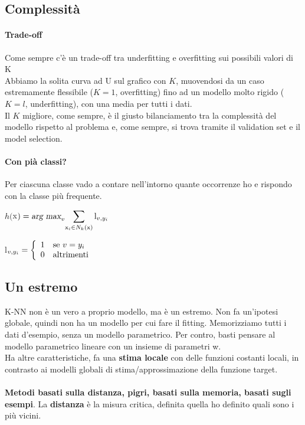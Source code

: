 \documentclass[10pt]{book}
\begin{document}
\subsection{Complessità}
\paragraph{Trade-off} Come sempre c'è un trade-off tra underfitting e overfitting sui possibili valori di K\\
Abbiamo la solita curva ad U sul grafico con $K$, muovendosi da un caso estremamente flessibile ($K=1$, overfitting) fino ad un modello molto rigido ($K=l$, underfitting), con una media per tutti i dati.\\
Il $K$ migliore, come sempre, è il giusto bilanciamento tra la complessità del modello rispetto al problema e, come sempre, si trova tramite il validation set e il model selection.
\pagebreak
\paragraph{Con pià classi?} Per ciascuna classe vado a contare nell'intorno quante occorrenze ho e rispondo con la classe più frequente.
\begin{list}{}{}
	\item $h($x$) = \textsl{arg max}_v \mathlarger{\sum_{\text{x}_i\in N_k(\text{x})}\text{l}_{v, y_i}}$
	\item l$_{v, y_i} = \left\{\begin{array}{l l}
	1 & \text{se } v = y_i\\
	0 & \text{altrimenti}
\end{array}	 \right.$
\end{list}
\subsection{Un estremo} K-NN non è un vero a proprio modello, ma è un estremo. Non fa un'ipotesi globale, quindi non ha un modello per cui fare il fitting. Memorizziamo tutti i dati d'esempio, senza un modello parametrico. Per contro, basti pensare al modello parametrico lineare con un insieme di parametri w.\\
Ha altre caratteristiche, fa una \textbf{stima locale} con delle funzioni costanti locali, in contrasto ai modelli globali di stima/approssimazione della funzione target.\\\\
\textbf{Metodi basati sulla distanza, pigri, basati sulla memoria, basati sugli esempi}. La \textbf{distanza} è la misura critica, definita quella ho definito quali sono i più vicini.
\end{document}
